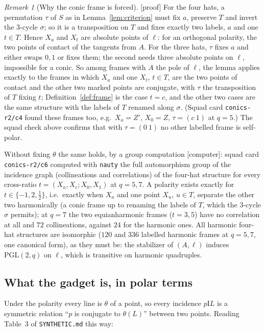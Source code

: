\documentclass[11pt]{amsart}
\theoremstyle{definition}
\theoremstyle{remark}
\newtheorem{remark}[theorem]{Remark}
\newcommand{\I}{\mathrel{\mathrm{I}}}
\newcommand{\status}[1]{\textup{[#1]}}
\begin{document}
\begin{remark}[Why the conic frame is forced]\label{rem:forced}
\status{proof} For the four hats, a permutation $\tau$ of $S$ as in Lemma~\ref{lem:criterion} must fix $a$, preserve
$T$ and invert the $3$-cycle $\sigma$; so it is a transposition on $T$ and fixes exactly two labels, $a$ and one
$t\in T$. Hence $X_a$ and $X_t$ are absolute points of $\ell$: for an orthogonal polarity, the two points of contact
of the tangents from $A$. For the three hats, $\tau$ fixes $a$ and either swaps $0,1$ or fixes them; the second needs
three absolute points on $\ell$, impossible for a conic. So among frames with $A$ the pole of $\ell$, the lemma
applies exactly to the frames in which $X_a$ and one $X_t$, $t\in T$, are the two points of contact and the other two
marked points are conjugate, with $\tau$ the transposition of $T$ fixing $t$; Definition~\ref{def:frame} is the case
$t=c$, and the other two cases are the same structure with the labels of $T$ renamed along $\sigma$. (Squad card
\texttt{conics-r2/c4} found these frames too, e.g.\ $X_a=Z'$, $X_0=Z$, $\tau=(c\ 1)$ at $q=5$.) The squad check
above confirms that with $\tau=(0\ 1)$ no other labelled frame is self-polar.

Without fixing $\theta$ the same holds, by a group computation \status{computer}: squad card \texttt{conics-r2/c6}
computed with \texttt{nauty} the full automorphism group of the incidence graph (collineations and correlations) of
the four-hat structure for every cross-ratio $t=(X_a,X_c;X_0,X_1)$ at $q=5,7$. A polarity exists exactly for
$t\in\{-1,2,\tfrac12\}$, i.e.\ exactly when $X_a$ and one point $X_u$, $u\in T$, separate the other two harmonically
(a conic frame up to renaming the labels of $T$, which the $3$-cycle $\sigma$ permits); at $q=7$ the two equianharmonic
frames ($t=3,5$) have no correlation at all and $72$ collineations, against $24$ for the harmonic ones. All
harmonic four-hat structures are isomorphic ($120$ and $336$ labelled harmonic frames at $q=5,7$, one canonical
form), as they must be: the stabilizer of $(A,\ell)$ induces $\mathrm{PGL}(2,q)$ on $\ell$, which is transitive on
harmonic quadruples.
\end{remark}

\subsection{What the gadget is, in polar terms}
Under the polarity every line is $\theta$ of a point, so every incidence $p\I L$ is a symmetric relation
``$p$ is conjugate to $\theta(L)$'' between two points. Reading Table~3 of \texttt{SYNTHETIC.md} this way:
\end{document}
